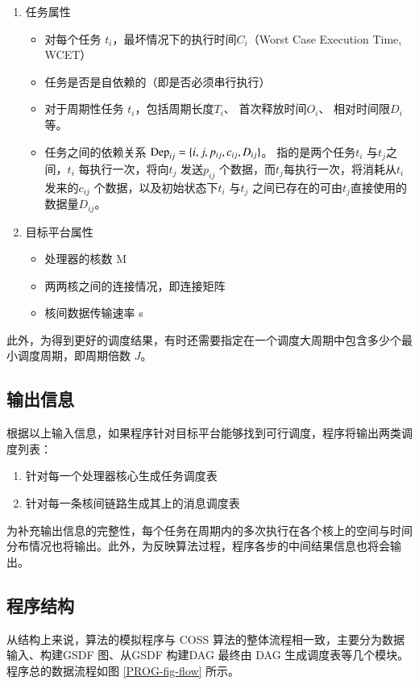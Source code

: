\begin{enumerate}
  \item 任务属性
    \begin{itemize}
      \item 对每个任务 $t_i$，最坏情况下的执行时间$C_i$（Worst Case Execution Time, WCET）
      \item 任务是否是自依赖的（即是否必须串行执行）
      \item 对于周期性任务 $t_i$，包括周期长度$T_i$、 首次释放时间$O_i$、 相对时间限$D_i$ 等。
      \item 任务之间的依赖关系 $\textnormal{Dep}_{ij}=\{i,j,p_{ij},c_{ij},D_{ij}\}$。 指的是两个任务$t_i$ 与$t_j$之间，$t_i$ 每执行一次，将向$t_j$ 发送$p_{ij}$ 个数据，而$t_j$每执行一次，将消耗从$t_i$ 发来的$c_{ij}$ 个数据，以及初始状态下$t_i$ 与$t_j$ 之间已存在的可由$t_j$直接使用的数据量$D_{ij}$。
    \end{itemize}
  \item 目标平台属性
    \begin{itemize}
      \item 处理器的核数 M
      \item 两两核之间的连接情况，即连接矩阵
      \item 核间数据传输速率 s
    \end{itemize}
\end{enumerate}

此外，为得到更好的调度结果，有时还需要指定在一个调度大周期中包含多少个最小调度周期，即周期倍数 $J$。


\subsection{输出信息}

根据以上输入信息，如果程序针对目标平台能够找到可行调度，程序将输出两类调度列表：
\begin{enumerate}
  \item 针对每一个处理器核心生成任务调度表
  \item 针对每一条核间链路生成其上的消息调度表
\end{enumerate}

为补充输出信息的完整性，每个任务在周期内的多次执行在各个核上的空间与时间分布情况也将输出。此外，为反映算法过程，程序各步的中间结果信息也将会输出。

\subsection{程序结构}
从结构上来说，算法的模拟程序与 COSS 算法的整体流程相一致，主要分为数据输入、构建GSDF 图、从GSDF 构建DAG 最终由 DAG 生成调度表等几个模块。程序总的数据流程如图 \ref{PROG-fig-flow} 所示。

